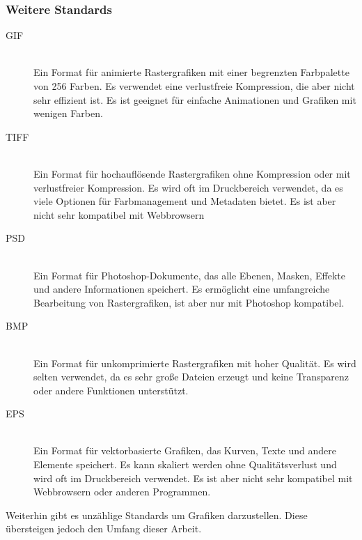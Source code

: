     \subsubsection{Weitere Standards}
        \begin{description}
            \item[\ac{GIF}]~\\
                Ein Format für animierte Rastergrafiken mit einer begrenzten Farbpalette von 256 Farben. 
                Es verwendet eine verlustfreie Kompression, die aber nicht sehr effizient ist. 
                Es ist geeignet für einfache Animationen und Grafiken mit wenigen Farben.
            \item[\ac{TIFF}]~\\
                Ein Format für hochauflösende Rastergrafiken ohne Kompression oder mit verlustfreier Kompression.
                Es wird oft im Druckbereich verwendet, da es viele Optionen für Farbmanagement und Metadaten bietet.
                Es ist aber nicht sehr kompatibel mit Webbrowsern \\
            \item[\ac{PSD}]~\\
                Ein Format für Photoshop-Dokumente, das alle Ebenen, Masken, Effekte und andere Informationen speichert.
                Es ermöglicht eine umfangreiche Bearbeitung von Rastergrafiken, ist aber nur mit Photoshop kompatibel.\\
            \item[\ac{BMP}]~\\
                Ein Format für unkomprimierte Rastergrafiken mit hoher Qualität.
                Es wird selten verwendet, da es sehr große Dateien erzeugt und keine Transparenz oder andere Funktionen unterstützt. \\
            \item[\ac{EPS}]~\\
                Ein Format für vektorbasierte Grafiken, das Kurven, Texte und andere Elemente speichert.
                Es kann skaliert werden ohne Qualitätsverlust und wird oft im Druckbereich verwendet.
                Es ist aber nicht sehr kompatibel mit Webbrowsern oder anderen Programmen. \\
        \end{description}
        Weiterhin gibt es unzählige Standards um Grafiken darzustellen. Diese übersteigen jedoch den Umfang dieser Arbeit.
